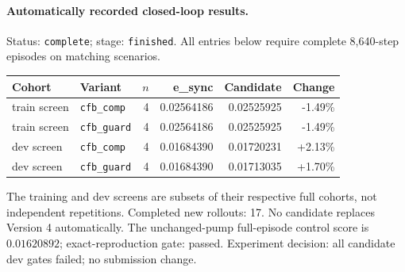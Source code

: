 \paragraph{Automatically recorded closed-loop results.}
Status: \texttt{complete}; stage: \texttt{finished}.
All entries below require complete 8,640-step episodes on matching scenarios.
\begin{center}\small
\begin{tabular}{llrrrr}\toprule
Cohort & Variant & $n$ & e\_sync & Candidate & Change \\\midrule
train screen & \texttt{cfb\_comp} & 4 & 0.02564186 & 0.02525925 & -1.49\% \\
train screen & \texttt{cfb\_guard} & 4 & 0.02564186 & 0.02525925 & -1.49\% \\
dev screen & \texttt{cfb\_comp} & 4 & 0.01684390 & 0.01720231 & +2.13\% \\
dev screen & \texttt{cfb\_guard} & 4 & 0.01684390 & 0.01713035 & +1.70\% \\
\bottomrule\end{tabular}\end{center}
The training and dev screens are subsets of their respective full cohorts, not independent repetitions.
Completed new rollouts: 17. No candidate replaces Version 4 automatically.
The unchanged-pump full-episode control score is $0.01620892$; exact-reproduction gate: passed.
Experiment decision: all candidate dev gates failed; no submission change.
